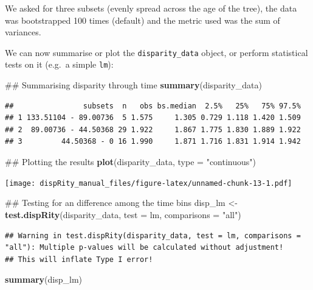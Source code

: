\documentclass[]{book}
\newenvironment{Shaded}{\begin{snugshade}}{\end{snugshade}}
\newcommand{\KeywordTok}[1]{\textcolor[rgb]{0.13,0.29,0.53}{\textbf{#1}}}
\newcommand{\DataTypeTok}[1]{\textcolor[rgb]{0.13,0.29,0.53}{#1}}
\newcommand{\StringTok}[1]{\textcolor[rgb]{0.31,0.60,0.02}{#1}}
\newcommand{\NormalTok}[1]{#1}
\theoremstyle{definition}
\theoremstyle{definition}
\theoremstyle{remark}
\begin{document}
We asked for three subsets (evenly spread across the age of the tree),
the data was bootstrapped 100 times (default) and the metric used was
the sum of variances.

We can now summarise or plot the \texttt{disparity\_data} object, or
perform statistical tests on it (e.g.~a simple \texttt{lm}):

\begin{Shaded}
\begin{Highlighting}[]
\NormalTok{## Summarising disparity through time}
\KeywordTok{summary}\NormalTok{(disparity_data)}
\end{Highlighting}
\end{Shaded}

\begin{verbatim}
##                subsets  n   obs bs.median  2.5%   25%   75% 97.5%
## 1 133.51104 - 89.00736  5 1.575     1.305 0.729 1.118 1.420 1.509
## 2  89.00736 - 44.50368 29 1.922     1.867 1.775 1.830 1.889 1.922
## 3         44.50368 - 0 16 1.990     1.871 1.716 1.831 1.914 1.942
\end{verbatim}

\begin{Shaded}
\begin{Highlighting}[]
\NormalTok{## Plotting the results}
\KeywordTok{plot}\NormalTok{(disparity_data, }\DataTypeTok{type =} \StringTok{"continuous"}\NormalTok{)}
\end{Highlighting}
\end{Shaded}

\texttt{[image: dispRity\_manual\_files/figure-latex/unnamed-chunk-13-1.pdf]}

\begin{Shaded}
\begin{Highlighting}[]
\NormalTok{## Testing for an difference among the time bins}
\NormalTok{disp_lm <-}\StringTok{ }\KeywordTok{test.dispRity}\NormalTok{(disparity_data, }\DataTypeTok{test =}\NormalTok{ lm, }\DataTypeTok{comparisons =} \StringTok{"all"}\NormalTok{)}
\end{Highlighting}
\end{Shaded}

\begin{verbatim}
## Warning in test.dispRity(disparity_data, test = lm, comparisons = "all"): Multiple p-values will be calculated without adjustment!
## This will inflate Type I error!
\end{verbatim}

\begin{Shaded}
\begin{Highlighting}[]
\KeywordTok{summary}\NormalTok{(disp_lm)}
\end{Highlighting}
\end{Shaded}
\end{document}
